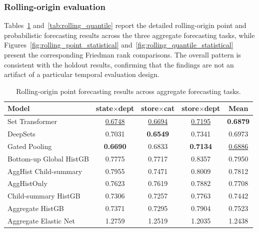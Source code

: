 \documentclass[12pt]{article}
\begin{document}
\subsubsection{Rolling-origin evaluation}

Tables~\ref{tab:rolling_point} and~\ref{tab:rolling_quantile} report the detailed rolling-origin point and probabilistic forecasting results across the three aggregate forecasting tasks, while Figures~\ref{fig:rolling_point_statistical} and~\ref{fig:rolling_quantile_statistical} present the corresponding Friedman rank comparisons. The overall pattern is consistent with the holdout results, confirming that the findings are not an artifact of a particular temporal evaluation design.

\begin{table}[H]
  \centering
  \caption{Rolling-origin point forecasting results across aggregate forecasting tasks.}
  \label{tab:rolling_point}
  \begin{threeparttable}
    \begin{tabular}{lcccc}
      \toprule
      Model                     & state$\times$dept  & store$\times$cat   & store$\times$dept  & Mean               \\
      \midrule
      Set Transformer                  & \underline{0.6748} & \underline{0.6694} & \underline{0.7195} & \textbf{0.6879}    \\
      DeepSets                  & 0.7031             & \textbf{0.6549}    & 0.7341             & 0.6973             \\
      Gated Pooling                  & \textbf{0.6690}    & 0.6833             & \textbf{0.7134}    & \underline{0.6886} \\
      Bottom-up Global HistGB  & 0.7775	      & 0.7717            	& 0.8357	           & 0.7950             \\
      AggHist Child-summary   & 0.7955             & 0.7471             & 0.8009             & 0.7812             \\
      AggHistOnly               & 0.7623             & 0.7619             & 0.7882             & 0.7708             \\
      Child-summary HistGB      & 0.7306             & 0.7257             & 0.7763             & 0.7442             \\
      Aggregate HistGB          & 0.7371             & 0.7295             & 0.7904             & 0.7523             \\
      Aggregate Elastic Net     & 1.2759             & 1.2519             & 1.2035             & 1.2438             \\

\end{tabular}
\end{threeparttable}
\end{table}
\end{document}
